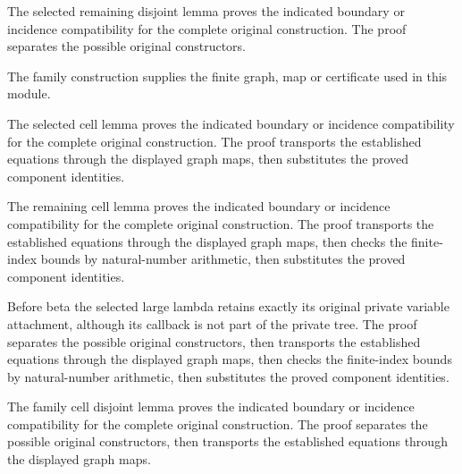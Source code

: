 The selected remaining disjoint lemma proves the indicated boundary or incidence compatibility for the complete original construction.
The proof separates the possible original constructors.
\par{}

The family construction supplies the finite graph, map or certificate used in this module.
\par{}

The selected cell lemma proves the indicated boundary or incidence compatibility for the complete original construction.
The proof transports the established equations through the displayed graph maps, then substitutes the proved component identities.
\par{}

The remaining cell lemma proves the indicated boundary or incidence compatibility for the complete original construction.
The proof transports the established equations through the displayed graph maps, then checks the finite-index bounds by natural-number arithmetic, then substitutes the proved component identities.
\par{}

Before beta the selected large lambda retains exactly its original private
variable attachment, although its callback is not part of the private tree.
The proof separates the possible original constructors, then transports the established equations through the displayed graph maps, then checks the finite-index bounds by natural-number arithmetic, then substitutes the proved component identities.
\par{}

The family cell disjoint lemma proves the indicated boundary or incidence compatibility for the complete original construction.
The proof separates the possible original constructors, then transports the established equations through the displayed graph maps.
\par{}

